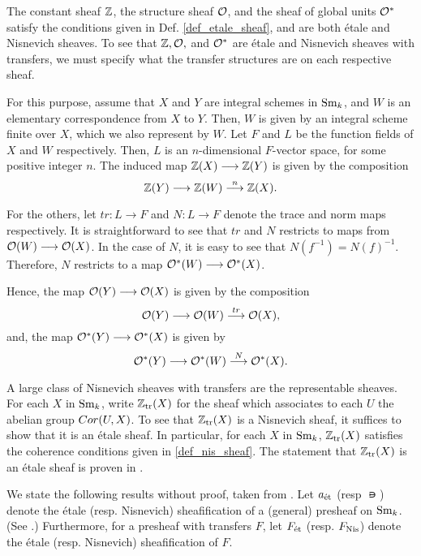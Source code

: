 \begin{ex}\label{ex_Z_O_Ostar}
The constant sheaf $\mathbb{Z}$, the structure sheaf $\mathcal{O}$, and the sheaf
of global units $\mathcal{O}^*$ satisfy the conditions given in Def. 
\ref{def_etale_sheaf}, and are both \'etale and Nisnevich sheaves.
To see that $\mathbb{Z}, \mathcal{O},$ and $\mathcal{O}^*$ are \'etale and Nisnevich sheaves
with transfers, we must specify what the transfer structures are
on each respective sheaf.

For this purpose, assume that $X$ and $Y$ are integral schemes
in $\mathrm{Sm}_{k}$, and $W$ is an elementary correspondence from $X$ to $Y$. 
Then, $W$ is given by an integral scheme finite over $X$, which we 
also represent by $W$. Let $F$ and $L$ be the function fields of 
$X$ and $W$ respectively. Then, $L$ is an $n$-dimensional
$F$-vector space, for some positive integer $n$. The induced 
map $\mathbb{Z}(X) \longrightarrow \mathbb{Z}(Y)$ is given by the composition
\[
\mathbb{Z}(Y) \longrightarrow \mathbb{Z}(W) \stackrel{n}{\longrightarrow} \mathbb{Z}(X).
\]

For the others, let $tr: L \to F$ and $N: L \to F$ denote the 
trace and norm maps respectively. It is straightforward to see 
that $tr$ and $N$ restricts to maps from $\mathcal{O}(W) \longrightarrow \mathcal{O}(X)$. In
the case of $N$, it is easy to see that $N(f^{-1}) = N(f)^{-1}$.
Therefore, $N$ restricts to a map $\mathcal{O}^*(W) \longrightarrow \mathcal{O}^*(X)$.

Hence, the map $\mathcal{O}(Y) \longrightarrow \mathcal{O}(X)$ is given by the composition
\[
\mathcal{O}(Y) \longrightarrow \mathcal{O}(W) \stackrel{tr}{\longrightarrow} \mathcal{O}(X),
\]
and, the map $\mathcal{O}^*(Y) \longrightarrow \mathcal{O}^*(X)$ is given by
\[
\mathcal{O}^*(Y) \longrightarrow \mathcal{O}^*(W) \stackrel{N}{\longrightarrow} \mathcal{O}^*(X).
\]
\end{ex}

\begin{ex}\label{ex_ZtrX}
A large class of Nisnevich sheaves with transfers are the 
representable sheaves. For each $X$ in $\mathrm{Sm}_{k}$, write $\mathbb{Z}_{\mathrm{tr}}(X)$
for the sheaf which associates to each $U$ the abelian group
$Cor(U, X)$. To see that $\mathbb{Z}_{\mathrm{tr}}(X)$ is a Nisnevich sheaf, it
suffices to show that it is an \'etale sheaf. In particular,
for each $X$ in $\mathrm{Sm}_{k}$, $\mathbb{Z}_{\mathrm{tr}}(X)$ satisfies the coherence 
conditions given in \ref{def_nis_sheaf}. The statement that
$\mathbb{Z}_{\mathrm{tr}}(X)$ is an \'etale sheaf is proven in \cite[6.2]{MVW}.
\end{ex}

We state the following results without proof, taken from 
\cite{MVW}. Let $a_{\mathrm{\acute{e}t}}$ (resp $\nis$) denote the \'etale
(resp. Nisnevich) sheafification of a (general) presheaf
on $\mathrm{Sm}_{k}$. (See \cite[3.1.1]{Tamme}.) Furthermore, for a presheaf 
with transfers $F$, let $F_{\mathrm{\acute{e}t}}$ (resp. $F_{\mathrm{Nis}}$) denote the 
\'etale (resp.  Nisnevich) sheafification of $F$. 

